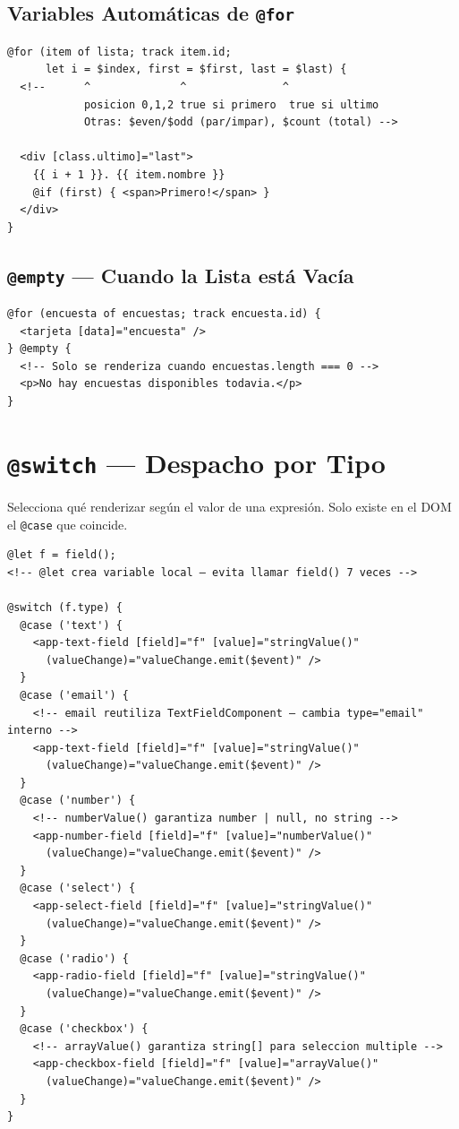 \documentclass[12pt, a4paper]{article}
\begin{document}
\subsection{Variables Automáticas de \texttt{@for}}

\begin{lstlisting}
@for (item of lista; track item.id;
      let i = $index, first = $first, last = $last) {
  <!--      ^              ^               ^
            posicion 0,1,2 true si primero  true si ultimo
            Otras: $even/$odd (par/impar), $count (total) -->

  <div [class.ultimo]="last">
    {{ i + 1 }}. {{ item.nombre }}
    @if (first) { <span>Primero!</span> }
  </div>
}
\end{lstlisting}

\subsection{\texttt{@empty} --- Cuando la Lista está Vacía}

\begin{lstlisting}
@for (encuesta of encuestas; track encuesta.id) {
  <tarjeta [data]="encuesta" />
} @empty {
  <!-- Solo se renderiza cuando encuestas.length === 0 -->
  <p>No hay encuestas disponibles todavia.</p>
}
\end{lstlisting}

\section{ \texttt{@switch} --- Despacho por Tipo}

Selecciona qué renderizar según el valor de una expresión.
Solo existe en el DOM el \texttt{@case} que coincide.

\begin{lstlisting}
@let f = field();
<!-- @let crea variable local — evita llamar field() 7 veces -->

@switch (f.type) {
  @case ('text') {
    <app-text-field [field]="f" [value]="stringValue()"
      (valueChange)="valueChange.emit($event)" />
  }
  @case ('email') {
    <!-- email reutiliza TextFieldComponent — cambia type="email" interno -->
    <app-text-field [field]="f" [value]="stringValue()"
      (valueChange)="valueChange.emit($event)" />
  }
  @case ('number') {
    <!-- numberValue() garantiza number | null, no string -->
    <app-number-field [field]="f" [value]="numberValue()"
      (valueChange)="valueChange.emit($event)" />
  }
  @case ('select') {
    <app-select-field [field]="f" [value]="stringValue()"
      (valueChange)="valueChange.emit($event)" />
  }
  @case ('radio') {
    <app-radio-field [field]="f" [value]="stringValue()"
      (valueChange)="valueChange.emit($event)" />
  }
  @case ('checkbox') {
    <!-- arrayValue() garantiza string[] para seleccion multiple -->
    <app-checkbox-field [field]="f" [value]="arrayValue()"
      (valueChange)="valueChange.emit($event)" />
  }
}
\end{lstlisting}
\end{document}
